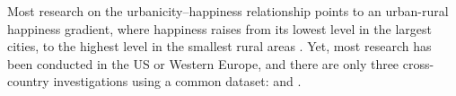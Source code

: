 \documentclass[11pt, letterpaper]{article}
\begin{document}


Most research on the urbanicity--happiness relationship points to an urban-rural happiness gradient, where happiness raises from its lowest level in the largest cities, to the highest level in the smallest rural areas
\citep[e.g.,][]{campbell76etal,aok20}.%
%
Yet, most research has been conducted in the US or Western Europe, and there are only three cross-country investigations using a common dataset: \citet{aokcities,easterlin10al} and \citet{burger20}.
\end{document}
